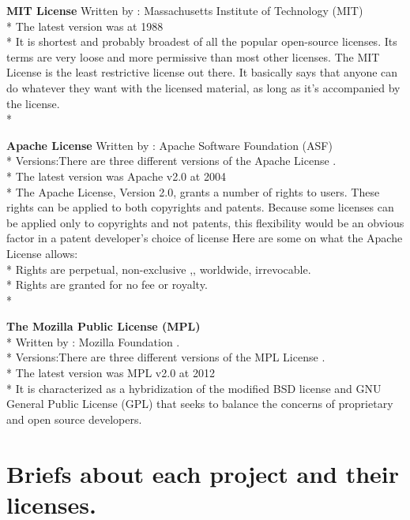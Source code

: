 \documentclass[11pt]{article} %
\begin{document}
{\bf MIT License}
Written by : Massachusetts Institute of Technology (MIT)\\* 
The latest version was at 1988\\* 
It is shortest and probably broadest of all the popular open-source licenses. Its terms are very loose and more permissive than most other licenses. The MIT License is the least restrictive license out there. It basically says that anyone can do whatever they want with the licensed material, as long as it’s accompanied by the license.\\* 

{\bf Apache License}
Written by : Apache Software Foundation (ASF) \\* 
Versions:There are three different versions of the Apache License .\\* 
The latest version was Apache v2.0 at 2004\\* 
The Apache License, Version 2.0, grants a number of rights to users. These rights can be applied to both copyrights and patents. 
Because some licenses can be applied only to copyrights and not patents, this flexibility would be an obvious factor in a patent developer’s choice of license
Here are some on what the Apache License allows:\\* 
Rights are perpetual, non-exclusive ,, worldwide, irrevocable.\\* 
Rights are granted for no fee or royalty.\\* 

{\bf The Mozilla Public License (MPL)}\\* 
Written by : Mozilla Foundation .\\* 
Versions:There are three different versions of the MPL License .\\* 
The latest version was MPL v2.0 at 2012\\* 
It is characterized as a hybridization of the modified BSD license and GNU General Public License (GPL) that seeks to balance the concerns of proprietary and open source developers.

\section{Briefs about each project and their licenses.}
\end{document}

